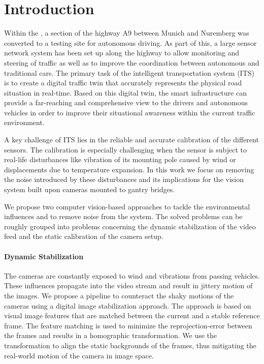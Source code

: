 
\section{Introduction}

Within the \Providentia{}, a section of the highway A9 between Munich and Nuremberg was converted to a testing site for autonomous driving. 
As part of this, a large sensor network system has been set up along the highway to allow monitoring and steering of traffic as well as to improve the coordination between autonomous and traditional cars. 
The primary task of the intelligent transportation system (ITS) is to create a digital traffic twin that accurately represents the physical road situation in real-time. 
Based on this digital twin, the smart infrastructure can provide a far-reaching and comprehensive view to the drivers and autonomous vehicles in order to improve their situational awareness within the current traffic environment.

A key challenge of ITS lies in the reliable and accurate calibration of the different sensors.
The calibration is especially challenging when the sensor is subject to real-life disturbances like vibration of its mounting pole caused by wind or displacements due to temperature expansion.
In this work we focus on removing the noise introduced by these disturbances and its implications for the vision system built upon cameras mounted to gantry bridges.

We propose two computer vision-based approaches to tackle the environmental influences and to remove noise from the system.
The solved problems can be roughly grouped into problems concerning the dynamic stabilization of the video feed and the static calibration of the camera setup.

\paragraph{Dynamic Stabilization}
The cameras are constantly exposed to wind and vibrations from passing vehicles.
These influences propagate into the video stream and result in jittery motion of the images.
We propose a pipeline to counteract the shaky motions of the cameras using a digital image stabilization approach.
The approach is based on visual image features that are matched between the current and a stable reference frame. 
The feature matching is used to minimize the reprojection-error between the frames and results in a homographic transformation.
We use the transformation to align the static backgrounds of the frames, thus mitigating the real-world motion of the camera in image space.


